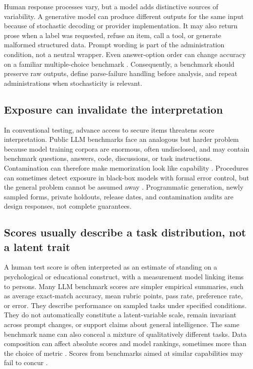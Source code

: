 \documentclass[12pt]{article}
\begin{document}
Human response processes vary, but a model adds distinctive sources of variability. A generative model can produce different outputs for the same input because of stochastic decoding or provider implementation. It may also return prose when a label was requested, refuse an item, call a tool, or generate malformed structured data. Prompt wording is part of the administration condition, not a neutral wrapper. Even answer-option order can change accuracy on a familiar multiple-choice benchmark \citep{gupta2024answerorder}. Consequently, a benchmark should preserve raw outputs, define parse-failure handling before analysis, and repeat administrations when stochasticity is relevant.

\subsection{Exposure can invalidate the interpretation}

In conventional testing, advance access to secure items threatens score interpretation. Public LLM benchmarks face an analogous but harder problem because model training corpora are enormous, often undisclosed, and may contain benchmark questions, answers, code, discussions, or task instructions. Contamination can therefore make memorization look like capability \citep{sainz2023contamination}. Procedures can sometimes detect exposure in black-box models with formal error control, but the general problem cannot be assumed away \citep{oren2024contamination}. Programmatic generation, newly sampled forms, private holdouts, release dates, and contamination audits are design responses, not complete guarantees.

\subsection{Scores usually describe a task distribution, not a latent trait}

A human test score is often interpreted as an estimate of standing on a psychological or educational construct, with a measurement model linking items to persons. Many LLM benchmark scores are simpler empirical summaries, such as average exact-match accuracy, mean rubric points, pass rate, preference rate, or error. They describe performance on sampled tasks under specified conditions. They do not automatically constitute a latent-variable scale, remain invariant across prompt changes, or support claims about general intelligence. The same benchmark name can also conceal a mixture of qualitatively different tasks. Data composition can affect absolute scores and model rankings, sometimes more than the choice of metric \citep{kovatchev2024transparency}. Scores from benchmarks aimed at similar capabilities may fail to concur \citep{sun2023validity}.
\end{document}
